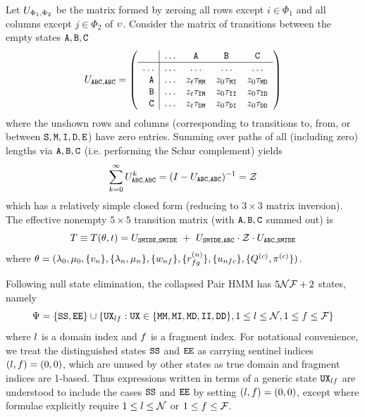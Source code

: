 Let $U_{\Phi_1,\Phi_2}$ be the matrix formed by zeroing all rows except $i \in \Phi_1$
and all columns except $j \in \Phi_2$ of $\upsilon$.
Consider the matrix of transitions between the empty states ${\tt A},{\tt B},{\tt C}$
\[
U_{{\tt A}{\tt B}{\tt C},{\tt A}{\tt B}{\tt C}} =
\left(
    \begin{array}{r|cccc}
    & \ldots & {\tt A} & {\tt B} & {\tt C} \\
    \hline
    \ldots & \ldots & \ldots & \ldots & \ldots \\
    {\tt A} & \ldots
    & z_t \tau_{{\tt M}{\tt M}}
    & z_0 \tau_{{\tt M}{\tt I}}
    & z_0 \tau_{{\tt M}{\tt D}}
    \\
    {\tt B} & \ldots
    & z_t \tau_{{\tt I}{\tt M}}
    & z_0 \tau_{{\tt I}{\tt I}}
    & z_0 \tau_{{\tt I}{\tt D}}
    \\
    {\tt C} & \ldots
    & z_t \tau_{{\tt D}{\tt M}} 
    & z_0 \tau_{{\tt D}{\tt I}}
    & z_0 \tau_{{\tt D}{\tt D}}
    \end{array}
\right)
\]
where the unshown rows and columns (corresponding to transitions to, from, or between ${\tt S},{\tt M},{\tt I},{\tt D},{\tt E}$) have zero entries.
Summing over paths of all (including zero) lengths via ${\tt A},{\tt B},{\tt C}$ (i.e. performing the Schur complement) yields
\[
\sum_{k=0}^\infty U_{{\tt A}{\tt B}{\tt C},{\tt A}{\tt B}{\tt C}}^k =
(I - U_{{\tt A}{\tt B}{\tt C},{\tt A}{\tt B}{\tt C}})^{-1}
= \mathcal{Z}
\]
which has a relatively simple closed form (reducing to $3 \times 3$ matrix inversion).
The effective nonempty $5 \times 5$ transition matrix (with ${\tt A},{\tt B},{\tt C}$ summed out) is
\[
\nonemptytrans \equiv
\nonemptytrans(\theta,\evoltime) =
\slicetrans_{\sta\mat\ins\del\fin,\sta\mat\ins\del\fin}
\ +\ 
\slicetrans_{\sta\mat\ins\del\fin,\mnull\inull\dnull}
\cdot \nullpathsum \cdot
\slicetrans_{\mnull\inull\dnull,\sta\mat\ins\del\fin}
\]
where $\theta = (\lambda_0,\mu_0,\{v_n\},\{\lambda_n,\mu_n\},\{w_{nf}\},\{r^{(n)}_{fg}\},\{u_{nfc}\},\{Q^{(c)},\pi^{(c)}\})$.

Following null state elimination, the collapsed Pair HMM has $5\mathcal{N}\mathcal{F}+2$ states, namely
\[\Psi = \{ {\tt S}{\tt S}, {\tt E}{\tt E} \} \cup \{ {\tt U}{\tt X}_{lf}:
{\tt U}{\tt X} \in \{{\tt M}{\tt M},{\tt M}{\tt I},{\tt M}{\tt D},{\tt I}{\tt I},{\tt D}{\tt D}\}, 1 \leq l \leq \mathcal{N}, 1 \leq f \leq \mathcal{F} \}\]
where $l$ is a domain index and $f$ is a fragment index.
For notational convenience, we treat the distinguished states ${\tt S}{\tt S}$ and ${\tt E}{\tt E}$ as carrying sentinel indices
$(l,f)=(0,0)$, which are unused by other states as true domain and fragment indices are 1-based.
Thus expressions written in terms of a generic state ${\tt U}{\tt X}_{lf}$
are understood to include the cases ${\tt S}{\tt S}$ and ${\tt E}{\tt E}$ by setting $(l,f)=(0,0)$,
except where formulae explicitly require $1 \leq l \leq \mathcal{N}$ or $1 \leq f \leq \mathcal{F}$.

